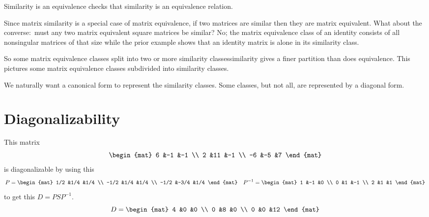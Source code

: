 \begin{frame}{Similarity is an equivalence}
 checks that
similarity is an equivalence relation.

\pause
Since matrix similarity is a special case of matrix equivalence, 
if two matrices are similar then they are matrix equivalent.
What about the converse:~must any two matrix equivalent square matrices be 
similar?
No; the matrix equivalence class
of an identity consists of all nonsingular matrices of that size while the 
prior example shows that an identity matrix is alone in its similarity
class. 

\pause
So some matrix equivalence classes
split into two or more similarity classes\Dash similarity gives a finer
partition than does equivalence.
This pictures some matrix equivalence classes subdivided into
similarity classes.

\pause
We naturally want a canonical form to represent the similarity classes.
Some classes, but not all,
are represented by a diagonal form.
\end{frame}




\section{Diagonalizability}
\begin{frame}
\df[df:Diagonalizable]

\ex
This matrix
\begin{equation*}
  \begin{mat}
    6 &-1  &-1 \\
    2 &11  &-1 \\
   -6 &-5  &7
  \end{mat}
\end{equation*}
is diagonalizable by using this
\begin{equation*}
  P=
  \begin{mat}
    1/2 &1/4  &1/4 \\
   -1/2 &1/4  &1/4 \\
   -1/2 &-3/4 &1/4
  \end{mat}
  \quad
  P^{-1}=
  \begin{mat}
    1 &-1 &0 \\
    0 &1 &-1 \\
    2 &1 &1
  \end{mat}
\end{equation*}
to get this $D=PSP^{-1}$.
\begin{equation*}
  D=
  \begin{mat}
    4 &0 &0 \\
    0 &8 &0 \\
    0 &0 &12
  \end{mat}
\end{equation*}
\end{frame}
\begin{frame}
\ex  
{}  
\end{frame}




